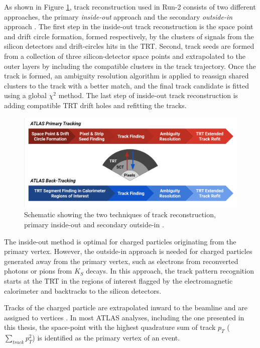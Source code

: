 As shown in Figure \ref{fig:TrackingOutline}, track reconstruction used in Run-2 consists of two different approaches, the primary \textit{inside-out} approach and the secondary \textit{outside-in} approach \cite{TrackingRun2_ATLAS}. The first step in the inside-out track reconstruction is the space point and drift circle formation, formed respectively, by the clusters of signals from the silicon detectors and drift-circles hits in the TRT. Second, track seeds are formed from a collection of three silicon-detector space points and extrapolated to the outer layers by including the compatible clusters in the track trajectory. Once the track is formed, an ambiguity resolution algorithm is applied to reassign shared clusters to the track with a better match, and the final track candidate is fitted using a global $\chi^{2}$ method. The last step of inside-out track reconstruction is adding compatible TRT drift holes and refitting the tracks. 

\begin{figure}[!htbp]
    \centering
    \includegraphics[width=.9\linewidth]{figures/LHC/trackingflowchart.png}
    \caption{Schematic showing the two techniques of track reconstruction, primary inside-out and secondary outside-in \cite{TrackingPic}. \label{fig:TrackingOutline}} 
\end{figure}

The inside-out method is optimal for charged particles originating from the primary vertex. However, the outside-in approach is needed for charged particles generated away from the primary vertex, such as electrons from reconverted photons or pions from $K_{S}$ decays. In this approach, the track pattern recognition starts at the TRT in the regions of interest flagged by the electromagnetic calorimeter and backtracks to the silicon detectors. 

Tracks of the charged particle are extrapolated inward to the beamline and are assigned to vertices \cite{VertexReconstruction}. In most ATLAS analyses, including the one presented in this thesis, the space-point with the highest quadrature sum of track $p_T$ ($\sum_{track}{p_{T}^2}$) is identified as the primary vertex of an event.

